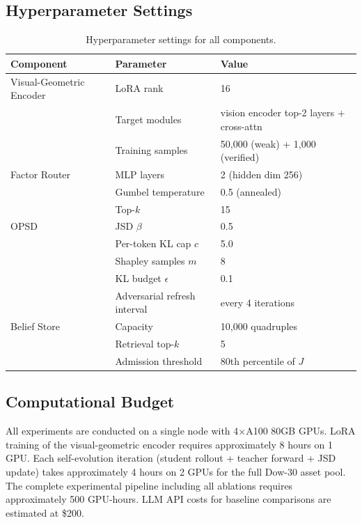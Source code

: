 \subsection{Hyperparameter Settings}

\begin{table}[h]
\centering
\small
\begin{tabular}{lll}
\toprule
Component & Parameter & Value \\
\midrule
Visual-Geometric Encoder & LoRA rank & 16 \\
 & Target modules & vision encoder top-2 layers + cross-attn \\
 & Training samples & 50,000 (weak) + 1,000 (verified) \\
Factor Router & MLP layers & 2 (hidden dim 256) \\
 & Gumbel temperature & 0.5 (annealed) \\
 & Top-$k$ & 15 \\
OPSD & JSD $\beta$ & 0.5 \\
 & Per-token KL cap $c$ & 5.0 \\
 & Shapley samples $m$ & 8 \\
 & KL budget $\epsilon$ & 0.1 \\
 & Adversarial refresh interval & every 4 iterations \\
Belief Store & Capacity & 10,000 quadruples \\
 & Retrieval top-$k$ & 5 \\
 & Admission threshold & 80th percentile of $J$ \\
\bottomrule
\end{tabular}
\caption{Hyperparameter settings for all components.}
\label{tab:hyperparams}
\end{table}

\subsection{Computational Budget}

All experiments are conducted on a single node with 4$\times$A100 80GB GPUs. LoRA training of the visual-geometric encoder requires approximately 8 hours on 1 GPU. Each self-evolution iteration (student rollout + teacher forward + JSD update) takes approximately 4 hours on 2 GPUs for the full Dow-30 asset pool. The complete experimental pipeline including all ablations requires approximately 500 GPU-hours. LLM API costs for baseline comparisons are estimated at \$200.
